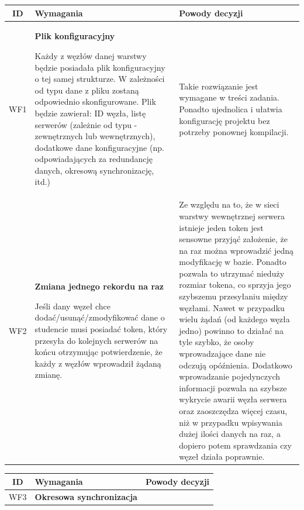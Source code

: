 {\begin{tabularx}{\textwidth}{|c|X|X|}
\hline
\textbf{ID} & \textbf{Wymagania}  & \textbf{Powody decyzji} \\
\hline

\label{z:WF1} WF1 & \textbf{Plik konfiguracyjny}


Każdy z węzłów danej warstwy będzie posiadała plik konfiguracyjny o tej samej strukturze. W zależności od typu dane z pliku zostaną odpowiednio skonfigurowane. Plik będzie zawierał: ID węzła, listę serwerów (zależnie od typu - zewnętrznych lub wewnętrznych), dodatkowe dane konfiguracyjne (np. odpowiadających za redundancję danych, okresową synchronizację, itd.) &
Takie rozwiązanie jest wymagane w treści zadania. Ponadto ujednolica i ułatwia konfigurację projektu bez potrzeby ponownej kompilacji.\\
\hline

\label{z:WF2} WF2 &  \textbf{Zmiana jednego rekordu na raz }

Jeśli dany węzeł chce dodać/usunąć/zmodyfikować dane o studencie musi posiadać token, który przesyła do kolejnych serwerów na końcu otrzymując potwierdzenie, że każdy z węzłów wprowadził żądaną zmianę. & 
Ze względu na to, że w sieci warstwy wewnętrznej serwera istnieje jeden token jest sensowne przyjąć założenie, że na raz można wprowadzić jedną modyfikację w bazie. Ponadto pozwala to utrzymać nieduży rozmiar tokena, co sprzyja jego szybszemu przesyłaniu między węzłami. Nawet w przypadku wielu żądań (od każdego węzła jedno) powinno to działać na tyle szybko, że osoby wprowadzające dane nie odczują opóźnienia. Dodatkowo wprowadzanie pojedynczych informacji pozwala na szybsze wykrycie awarii węzła serwera oraz zaoszczędza więcej czasu, niż w przypadku wpisywania dużej ilości danych na raz, a dopiero potem sprawdzania czy węzeł działa poprawnie. \\
\hline

\end{tabularx}
\newpage
\begin{tabularx}{\textwidth}{|c|X|X|}
\hline
\textbf{ID} & \textbf{Wymagania}  & \textbf{Powody decyzji} \\
\hline

\label{z:WF3} WF3 & \textbf{Okresowa synchronizacja}


\end{tabularx}}
